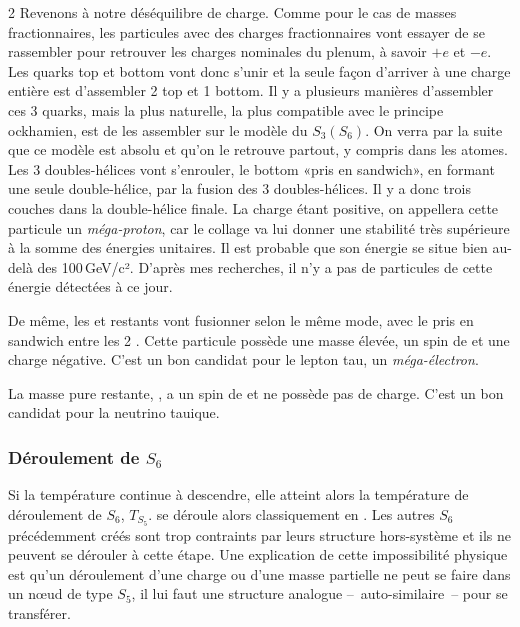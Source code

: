 \begin{multicols}{2}
Revenons à notre déséquilibre de charge. Comme pour le cas de masses
fractionnaires, les particules avec des charges fractionnaires vont
essayer de se rassembler pour retrouver les charges nominales du
plenum, à savoir $+e$ et $-e$. Les quarks top et bottom vont donc s'unir
et la seule façon d'arriver à une charge entière est d'assembler 2 top
et 1 bottom. Il y a plusieurs manières d'assembler ces 3 quarks, mais
la plus naturelle, la plus compatible avec le principe ockhamien, est de
les assembler sur le modèle du $S_3(S_6)$. On verra par la suite que ce
modèle est absolu et qu'on le retrouve partout, y compris dans les
atomes. Les 3 doubles-hélices vont s'enrouler, le bottom «pris en sandwich»,
en formant une seule double-hélice, par la fusion des 3 doubles-hélices. Il y
a donc trois couches dans la double-hélice finale. La charge étant
positive, on appellera cette particule un \textit{méga-proton}, car le collage
va lui donner une stabilité très supérieure à la somme des énergies
unitaires. Il est probable que son énergie se situe bien au-delà des
100\,GeV/c². D'après mes recherches, il n'y a pas de particules de cette
énergie détectées à ce jour.

De même, les  et  restants vont fusionner selon le
même mode, avec le  pris en sandwich entre les 2
. Cette particule possède une masse élevée, un spin de 
et une charge négative. C'est un bon candidat pour le lepton tau, un
\textit{méga-électron}.

La masse pure restante, , a un spin de  et ne possède pas
de charge. C'est un bon candidat pour la neutrino tauique.

\subsubsection{Déroulement de $S_6$}

Si la température continue à descendre, elle atteint alors la
température de déroulement de $S_6$, $T_{S_5}$.  se déroule alors
classiquement en . Les autres $S_6$ précédemment créés sont
trop contraints par leurs structure hors-système et ils ne peuvent se
dérouler à cette étape. Une explication de cette impossibilité
physique est qu'un déroulement d'une charge ou d'une masse partielle
ne peut se faire dans un nœud de type $S_5$, il lui faut une structure
analogue --~auto-similaire~-- pour se transférer.


\end{multicols}
